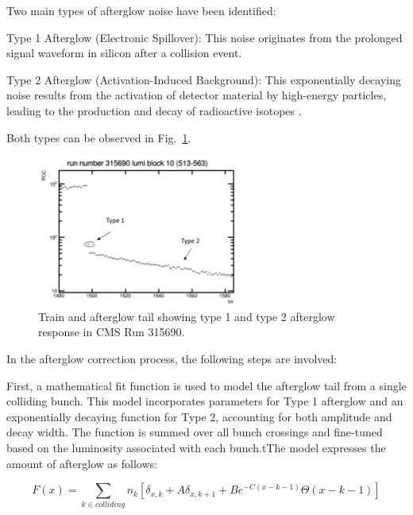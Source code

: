 Two main types of afterglow noise have been identified:

Type 1 Afterglow (Electronic Spillover): This noise originates from the prolonged signal waveform in silicon after a collision event.

Type 2 Afterglow (Activation-Induced Background): This exponentially decaying noise results from the activation of detector material by high-energy particles, leading to the production and decay of radioactive isotopes \cite{CMS-PAS-SMP-12-008}.

Both types can be observed in Fig.~\ref{fig:afterglow}.  

\begin{figure}[h]
    \centering
    \includegraphics[width=0.6\textwidth]{figures/performance_PCC/afterglow.png}
    \caption[Type 1 and Type 2 Afterglow Responses in CMS Run 315690]{Train and afterglow tail showing type 1 and type 2 afterglow response in CMS Run 315690.}
    \label{fig:afterglow}
\end{figure}


In the afterglow correction process, the following steps are involved:

First, a mathematical fit function is used to model the afterglow tail from a single colliding bunch. This model incorporates parameters for Type 1 afterglow and an exponentially decaying function for Type 2, accounting for both amplitude and decay width. The function is summed over all bunch crossings and fine-tuned based on the luminosity associated with each bunch.tThe model expresses the amount of afterglow as follows:

\begin{equation}
F(x) = \sum_{k\in colliding } n_k \left[ \delta_{x,k} + A  \delta_{x,k+1} + B e^{-C(x - k - 1)}  \Theta(x-k-1) \right]
\end{equation}

